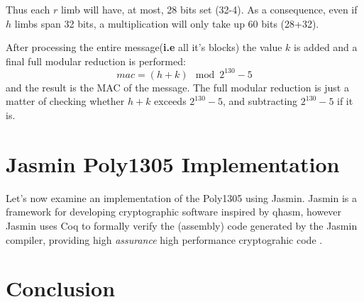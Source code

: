 \documentclass[twocolumn]{article}
\begin{document}
Thus each $r$ limb will have, at most, 28 bits set (32-4). As a consequence, even if $h$ limbs span 32 bits, a multiplication will only take up 60 bits (28+32).

After processing the entire message(\textbf{i.e} all it's blocks) the value $k$ is added and a final full modular reduction is performed:
$$mac = (h+k) \mod{2^{130}-5} $$
and the result is the MAC of the message.
\newline
The full modular reduction is just a matter of checking whether $h+k$ exceeds $2^{130}-5$, and subtracting $2^{130}-5$ if it is.

\section{Jasmin Poly1305 Implementation}
Let's now examine an implementation of the Poly1305 using Jasmin. Jasmin is a framework for developing cryptographic software inspired by qhasm, however Jasmin uses Coq 
to formally verify the (assembly) code generated by the Jasmin compiler, providing high \textit{assurance} high performance cryptograhic code \cite{jasmin_paper}.

\section{Conclusion}

\printbibliography

\onecolumn
\begin{appendices}
\end{appendices}
\end{document}
